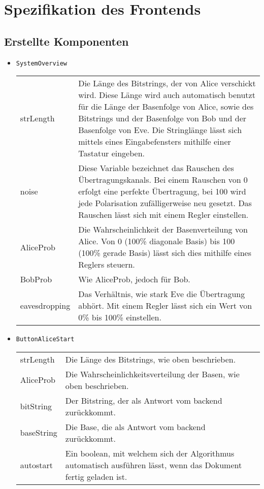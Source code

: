 \section{Spezifikation des Frontends}
\subsection{Erstellte Komponenten}
\begin{itemize}
\item \texttt{SystemOverview} \\[3mm]
\begin{tabularx}{\textwidth}{p{3cm}p{11cm}} 
strLength & Die Länge des Bitstrings, der von Alice verschickt wird. Diese Länge wird auch automatisch benutzt für die Länge der Basenfolge von Alice, sowie des Bitstrings und der Basenfolge von Bob und der Basenfolge von Eve. Die Stringlänge lässt sich mittels eines Eingabefensters mithilfe einer Tastatur eingeben. \\
noise & Diese Variable bezeichnet das Rauschen des Übertragungskanals. Bei einem Rauschen von 0 erfolgt eine perfekte Übertragung, bei 100 wird jede Polarisation zufälligerweise neu gesetzt. Das Rauschen lässt sich mit einem Regler einstellen. \\
AliceProb & Die Wahrscheinlichkeit der Basenverteilung von Alice. Von 0 (100\% diagonale Basis) bis 100 (100\% gerade Basis) lässt sich dies mithilfe eines Reglers steuern. \\
BobProb & Wie AliceProb, jedoch für Bob. \\
eavesdropping & Das Verhältnis, wie stark Eve die Übertragung abhört. Mit einem Regler lässt sich ein Wert von 0\% bis 100\% einstellen.
\end{tabularx}
\item \texttt{ButtonAliceStart}\\[3mm]
\begin{tabularx}{\textwidth}{p{3cm}p{11cm}} 
strLength & Die Länge des Bitstrings, wie oben beschrieben. \\
AliceProb & Die Wahrscheinlichkeitsverteilung der Basen, wie oben beschrieben. \\
bitString & Der Bitstring, der als Antwort vom backend zurückkommt. \\
baseString &  Die Base, die als Antwort vom backend zurückkommt. \\
autostart & Ein boolean, mit welchem sich der Algorithmus automatisch ausführen lässt, wenn das Dokument fertig geladen ist. \\

\end{tabularx}
\end{itemize}
